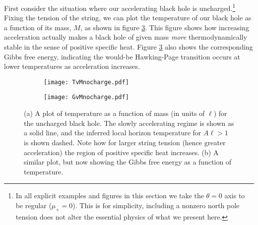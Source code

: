 \documentclass[
twoside,
openright,
frontopenright,
]{dmathesis}
\begin{document}
First consider the situation where our accelerating black hole is
uncharged.\footnote{In all explicit examples and figures in this section
  we take the $\theta=0$ axis to be regular ($\mu_+=0$). This is for simplicity,
  including a nonzero north pole tension does not alter the essential physics of
  what we present here.}  Fixing the tension of the string, we can plot the
temperature of our black hole as a function of its mass, $M$, as shown in figure
\ref{fig:TvMnocharge}.  This figure shows how increasing acceleration actually
makes a black hole of given mass {\it more} thermodynamically stable in the
sense of positive specific heat. Figure \ref{fig:TvMnocharge} also shows the
corresponding Gibbs free energy, indicating the would-be Hawking-Page transition
occurs at lower temperatures as acceleration increases.
\begin{figure}
  \centering
  \begin{subfigure}[b]{0.45\textwidth}
    \texttt{[image: TvMnocharge.pdf]}
    \caption{\label{fig:TvMnochargea}}
  \end{subfigure}\quad
  \begin{subfigure}[b]{0.45\textwidth}
    \texttt{[image: GvMnocharge.pdf]}
    \caption{\label{fig:TvMnocharge}}
  \end{subfigure}
  \caption{\label{fig:TvMnocharge}(a) A plot of temperature as a
    function of mass (in units of $\ell$) for the uncharged black hole.  The
    slowly accelerating regime is shown as a solid line, and the inferred
    local horizon temperature for $A\ell>1$ is shown dashed. Note how for larger
    string tension (hence greater acceleration) the region of positive specific
    heat increases. (b) A similar plot, but now showing the Gibbs free
    energy as a function of temperature.}
\end{figure}
\end{document}
